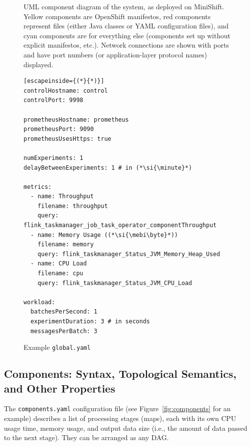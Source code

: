 \documentclass{article}
\begin{document}
\begin{figure}
  \caption{UML component diagram of the system, as deployed on MiniShift. Yellow
    components are OpenShift manifestos, red components represent files (either
    Java classes or YAML configuration files), and cyan components are for
    everything else (components set up without explicit manifestos, etc.).
    Network connections are shown with ports and have port numbers (or
    application-layer protocol names) displayed.}
  \label{fig:uml}
\end{figure}

\begin{figure}
  \centering
\begin{lstlisting}[escapeinside={(*}{*)}]
controlHostname: control
controlPort: 9998

prometheusHostname: prometheus
prometheusPort: 9090
prometheusUsesHttps: true

numExperiments: 1
delayBetweenExperiments: 1 # in (*\si{\minute}*)

metrics:
  - name: Throughput
    filename: throughput
    query: flink_taskmanager_job_task_operator_componentThroughput
  - name: Memory Usage ((*\si{\mebi\byte}*))
    filename: memory
    query: flink_taskmanager_Status_JVM_Memory_Heap_Used
  - name: CPU Load
    filename: cpu
    query: flink_taskmanager_Status_JVM_CPU_Load

workload:
  batchesPerSecond: 1
  experimentDuration: 3 # in seconds
  messagesPerBatch: 3
\end{lstlisting}
  \caption{Example \texttt{global.yaml}}
  \label{fig:global}
\end{figure}

\subsection{Components: Syntax, Topological Semantics, and Other
  Properties} \label{sec:components}

The \texttt{components.yaml} configuration file (see Figure~\ref{fig:components}
for an example) describes a list of processing stages (maps), each with its own
CPU usage time, memory usage, and output data size (i.e., the amount of data
passed to the next stage). They can be arranged as any DAG.
\end{document}
